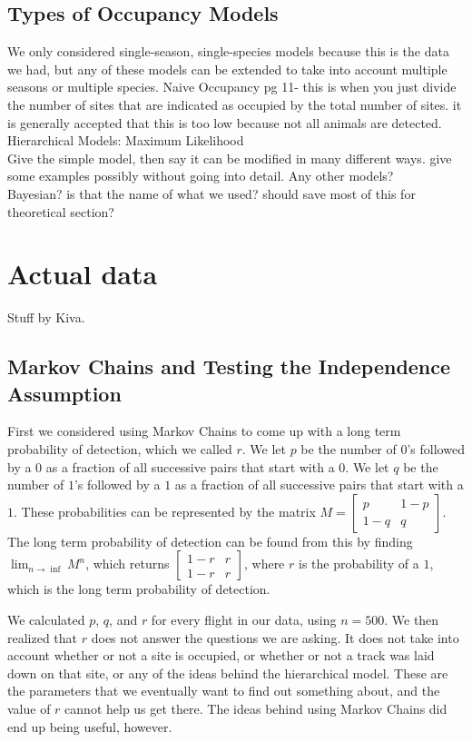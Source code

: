 \documentclass{article}
\begin{document}
	\subsection{Types of Occupancy Models}
		We only considered single-season, single-species models because this is 
the data we had, but any of these models can be extended to take into account
multiple seasons or multiple species.  
		Naive Occupancy pg 11- this is when you just divide the number of sites
			that are indicated as occupied by the total number of sites.  it is
			generally accepted that this is too low because not all animals are 
			detected.
		Hierarchical Models:
		Maximum Likelihood \\  Give the simple model, then say it can be 
			modified in many different ways.  give some examples possibly 
			without going into detail.
		Any other models? \\
		Bayesian?  is that the name of what we used?  should save most of this 
			for theoretical section?

\section{Actual data}
Stuff by Kiva.

	\subsection{Markov Chains and Testing the Independence Assumption}

		First we considered using Markov Chains to come up with a long term 
probability of detection, which we called \(r\).  We let \(p\) be the number of 
\(0\)'s followed by a \(0\) as a fraction of all successive pairs that start 
with a \(0\).  We let \(q\) be the number of \(1\)'s followed by a \(1\) as a 
fraction of all successive pairs that start with a \(1\).  These probabilities 
can be represented by the matrix \(M = \begin{bmatrix} p & 1-p \\ 1-q & q 
\end{bmatrix}\). The long term probability of detection can be found from this 
by finding \(\lim_{n \to \inf} M^n\), which returns \( \begin{bmatrix} 1-r & r 
\\ 1-r & r\end{bmatrix}\), where \(r\) is the probability of a \(1\), which is 
the long term probability of detection.  

	We calculated \(p\), \(q\), and \(r\) for every flight in our data, using 
\(n = 500\).  We then realized that \(r\) does not answer the questions we are 
asking.  It does not take into account whether or not a site is occupied, or 
whether or not a track was laid down on that site, or any of the ideas behind    
the hierarchical model.  These are the parameters that we eventually want to 
find out something about, and the value of \(r\) cannot help us get there.  The 
ideas behind using Markov Chains did end up being useful, however.  
	
\end{document}
